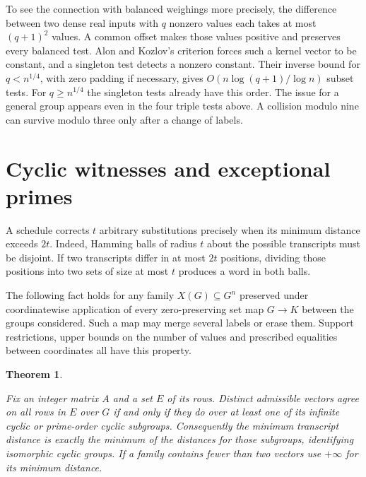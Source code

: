 \documentclass[11pt,letterpaper]{article}
\newtheorem{theorem}{Theorem}[section]
\numberwithin{equation}{section}
\begin{document}
To see the connection with balanced weighings more precisely, the difference between two dense
real inputs with $q$ nonzero values each takes at most $(q+1)^2$ values. A common offset makes
those values positive and preserves every balanced test. Alon and Kozlov's criterion forces
such a kernel vector to be constant, and a singleton test detects a nonzero constant. Their
inverse bound for $q<n^{1/4}$, with zero padding if necessary, gives $O(n\log(q+1)/\log n)$
subset tests. For $q\ge n^{1/4}$ the singleton tests already have this order. The issue for a
general group appears even in the four triple tests above. A collision modulo nine can survive
modulo three only after a change of labels.

\section{Cyclic witnesses and exceptional primes}\label{sec:cyclic}

A schedule corrects $t$ arbitrary substitutions precisely when its minimum distance exceeds
$2t$. Indeed, Hamming balls of radius $t$ about the possible transcripts must be disjoint. If
two transcripts differ in at most $2t$ positions, dividing those positions into two sets of
size at most $t$ produces a word in both balls.

The following fact holds for any family $X(G)\subseteq G^n$ preserved under coordinatewise
application of every zero-preserving set map $G\to K$ between the groups considered. Such a
map may merge several labels or erase them. Support restrictions, upper bounds on the number
of values and prescribed equalities between coordinates all have this property.

\begin{theorem}\label{thm:cyclic}

Fix an integer matrix $A$ and a set $E$ of its rows. Distinct admissible vectors agree on all
rows in $E$ over $G$ if and only if they do over at least one of its infinite cyclic or
prime-order cyclic subgroups. Consequently the minimum transcript distance is exactly the
minimum of the distances for those subgroups, identifying isomorphic cyclic groups. If a
family contains fewer than two vectors use $+\infty$ for its minimum distance.
\end{theorem}
\end{document}
